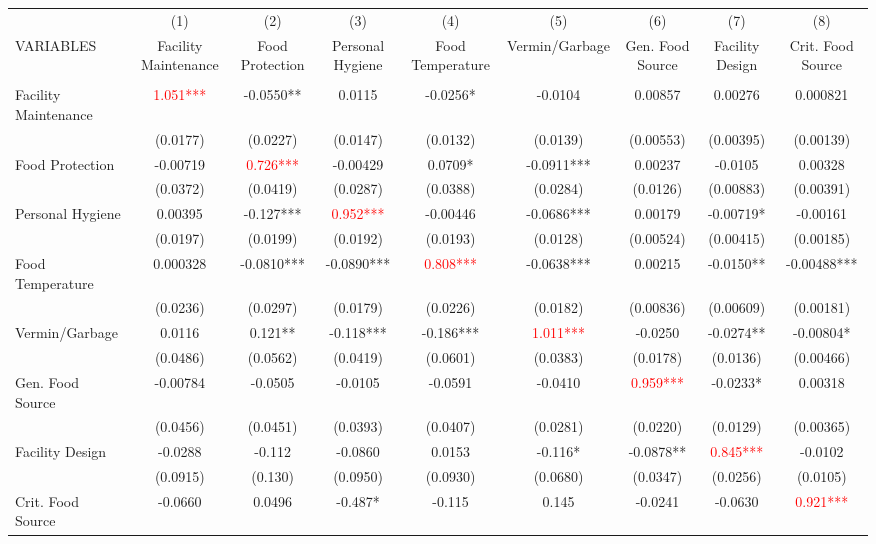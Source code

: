 \begin{tabular}{lcccccccc} \hline
 & (1) & (2) & (3) & (4) & (5) & (6) & (7) & (8) \\
VARIABLES & Facility Maintenance & Food Protection & Personal Hygiene & Food Temperature & Vermin/Garbage & Gen. Food Source & Facility Design & Crit. Food Source \\ \hline
 &  &  &  &  &  &  &  &  \\
Facility Maintenance & \textcolor{red}{1.051***} & -0.0550** & 0.0115 & -0.0256* & -0.0104 & 0.00857 & 0.00276 & 0.000821 \\
 & (0.0177) & (0.0227) & (0.0147) & (0.0132) & (0.0139) & (0.00553) & (0.00395) & (0.00139) \\
Food Protection & -0.00719 & \textcolor{red}{0.726***} & -0.00429 & 0.0709* & -0.0911*** & 0.00237 & -0.0105 & 0.00328 \\
 & (0.0372) & (0.0419) & (0.0287) & (0.0388) & (0.0284) & (0.0126) & (0.00883) & (0.00391) \\
Personal Hygiene & 0.00395 & -0.127*** & \textcolor{red}{0.952***} & -0.00446 & -0.0686*** & 0.00179 & -0.00719* & -0.00161 \\
 & (0.0197) & (0.0199) & (0.0192) & (0.0193) & (0.0128) & (0.00524) & (0.00415) & (0.00185) \\
Food Temperature & 0.000328 & -0.0810*** & -0.0890*** & \textcolor{red}{0.808***} & -0.0638*** & 0.00215 & -0.0150** & -0.00488*** \\
 & (0.0236) & (0.0297) & (0.0179) & (0.0226) & (0.0182) & (0.00836) & (0.00609) & (0.00181) \\
Vermin/Garbage & 0.0116 & 0.121** & -0.118*** & -0.186*** & \textcolor{red}{1.011***} & -0.0250 & -0.0274** & -0.00804* \\
 & (0.0486) & (0.0562) & (0.0419) & (0.0601) & (0.0383) & (0.0178) & (0.0136) & (0.00466) \\
Gen. Food Source & -0.00784 & -0.0505 & -0.0105 & -0.0591 & -0.0410 & \textcolor{red}{0.959***} & -0.0233* & 0.00318 \\
 & (0.0456) & (0.0451) & (0.0393) & (0.0407) & (0.0281) & (0.0220) & (0.0129) & (0.00365) \\
Facility Design & -0.0288 & -0.112 & -0.0860 & 0.0153 & -0.116* & -0.0878** & \textcolor{red}{0.845***} & -0.0102 \\
 & (0.0915) & (0.130) & (0.0950) & (0.0930) & (0.0680) & (0.0347) & (0.0256) & (0.0105) \\
Crit. Food Source & -0.0660 & 0.0496 & -0.487* & -0.115 & 0.145 & -0.0241 & -0.0630 & \textcolor{red}{0.921***} \\

\end{tabular}
